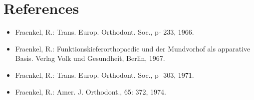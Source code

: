 \documentclass{article}
\begin{document}
\section*{References}
\begin{itemize}
\item Fraenkel, R.: Trans. Europ. Orthodont. Soc., p- 233, 1966.
\item Fraenkel, R.: Funktionskieferorthopaedie und der Mundvorhof als apparative Basis. Verlag Volk und Gesundheit, Berlin, 1967.
\item Fraenkel, R.: Trans. Europ. Orthodont. Soc., p- 303, 1971.
\item Fraenkel, R.: Amer. J. Orthodont., 65: 372, 1974.
\end{itemize}
\end{document}
